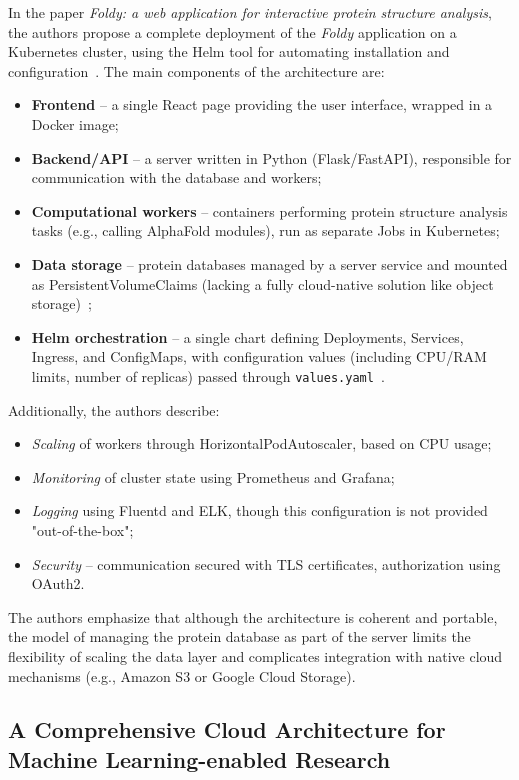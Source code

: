 In the paper \textit{Foldy: a web application for interactive protein structure analysis}, the authors propose a complete deployment of the \textit{Foldy} application on a Kubernetes cluster, using the Helm tool for automating installation and configuration~\cite{foldy,helm}.
The main components of the architecture are:
\begin{itemize}
    \item \textbf{Frontend} – a single React page providing the user interface, wrapped in a Docker image;
    \item \textbf{Backend/API} – a server written in Python (Flask/FastAPI), responsible for communication with the database and workers;
    \item \textbf{Computational workers} – containers performing protein structure analysis tasks (e.g., calling AlphaFold modules), run as separate Jobs in Kubernetes;
    \item \textbf{Data storage} – protein databases managed by a server service and mounted as PersistentVolumeClaims (lacking a fully cloud-native solution like object storage)~\cite{foldy};
    \item \textbf{Helm orchestration} – a single chart defining Deployments, Services, Ingress, and ConfigMaps, with configuration values (including CPU/RAM limits, number of replicas) passed through \texttt{values.yaml}~\cite{helm}.
\end{itemize}
Additionally, the authors describe:
\begin{itemize}
    \item \emph{Scaling} of workers through HorizontalPodAutoscaler, based on CPU usage;
    \item \emph{Monitoring} of cluster state using Prometheus and Grafana;
    \item \emph{Logging} using Fluentd and ELK, though this configuration is not provided "out-of-the-box";
    \item \emph{Security} – communication secured with TLS certificates, authorization using OAuth2.
\end{itemize}
The authors emphasize that although the architecture is coherent and portable, the model of managing the protein database as part of the server limits the flexibility of scaling the data layer and complicates integration with native cloud mechanisms (e.g., Amazon S3 or Google Cloud Storage).

\subsection{A Comprehensive Cloud Architecture for Machine Learning-enabled Research}

